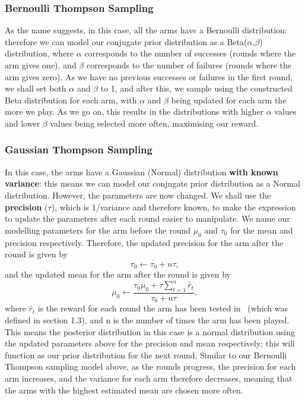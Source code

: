 \subsubsection{Bernoulli Thompson Sampling}
As the name suggests, in this case, all the arms have a Bernoulli distribution: therefore we can model our conjugate prior distribution as a Beta($\alpha$,$\beta$) distribution, where $\alpha$ corresponds to the number of successes (rounds where the arm gives one), and $\beta$ corresponds to the number of failures (rounds where the arm gives zero).
As we have no previous successes or failures in the first round, we shall set both $\alpha$ and $\beta$ to 1, and after this, we sample using the constructed Beta distribution for each arm, with $\alpha$ and $\beta$ being updated for each arm the more we play.
As we go on, this results in the distributions with higher $\alpha$ values and lower $\beta$ values being selected more often, maximising our reward.

\subsubsection{Gaussian Thompson Sampling}
In this case, the arms have a Gaussian (Normal) distribution \textbf{with known variance}: this means we can model our conjugate prior distribution as a Normal distribution.
However, the parameters are now changed.
We shall use the \textbf{precision} ($\tau$), which is 1/variance and therefore known, to make the expression to update the parameters after each round easier to manipulate.
We name our modelling parameters for the arm before the round $\mu_0$ and $\tau_0$ for the mean and precision respectively.
Therefore, the updated precision for the arm after the round is given by
\[\tau_0\xleftarrow{}\tau_0 + n\tau\text{,}\]
and the updated mean for the arm after the round is given by
\[\mu_0\xleftarrow{}\frac{\tau_0\mu_0 + \tau\sum_{t=1}^n\widehat{r}_t}{\tau_0 + n\tau}\text{,}\]
where $\widehat{r}_t$ is the reward for each round the arm has been tested in~\citep{agrawal2013further} (which was defined in section 1.3), and n is the number of times the arm has been played.
This means the posterior distribution in this case is a normal distribution using the updated parameters above for the precision and mean respectively;
this will function as our prior distribution for the next round.
Similar to our Bernoulli Thompson sampling model above, as the rounds progress, the precision for each arm increases, and the variance for each arm therefore decreases, meaning that the arms with the highest estimated mean are chosen more often.
